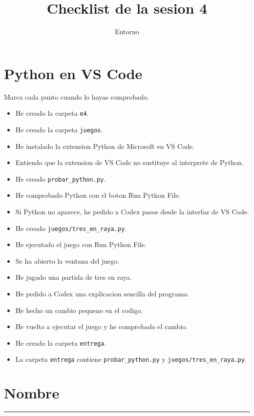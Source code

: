 \documentclass[a4paper,12pt]{article}
\title{Checklist de la sesion 4}
\author{Entorno}
\date{}
\begin{document}
\maketitle

\section*{Python en VS Code}

Marca cada punto cuando lo hayas comprobado.

\begin{itemize}
    \item[$\square$] He creado la carpeta \texttt{e4}.
    \item[$\square$] He creado la carpeta \texttt{juegos}.
    \item[$\square$] He instalado la extension Python de Microsoft en VS Code.
    \item[$\square$] Entiendo que la extension de VS Code no sustituye al interprete de Python.
    \item[$\square$] He creado \texttt{probar\_python.py}.
    \item[$\square$] He comprobado Python con el boton Run Python File.
    \item[$\square$] Si Python no aparece, he pedido a Codex pasos desde la interfaz de VS Code.
    \item[$\square$] He creado \texttt{juegos/tres\_en\_raya.py}.
    \item[$\square$] He ejecutado el juego con Run Python File.
    \item[$\square$] Se ha abierto la ventana del juego.
    \item[$\square$] He jugado una partida de tres en raya.
    \item[$\square$] He pedido a Codex una explicacion sencilla del programa.
    \item[$\square$] He hecho un cambio pequeno en el codigo.
    \item[$\square$] He vuelto a ejecutar el juego y he comprobado el cambio.
    \item[$\square$] He creado la carpeta \texttt{entrega}.
    \item[$\square$] La carpeta \texttt{entrega} contiene \texttt{probar\_python.py} y \texttt{juegos/tres\_en\_raya.py}.
\end{itemize}

\section*{Nombre}

\vspace{1cm}

\hrule
\end{document}
